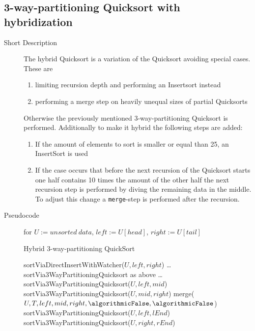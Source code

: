 \documentclass[11pt]{amsart}
\begin{document}
\newpage
\subsection{3-way-partitioning Quicksort with hybridization}
\begin{description}
	\item[Short Description] The hybrid Quicksort is a variation of the Quicksort avoiding special cases. These are
	\begin{enumerate}
		\item limiting recursion depth and performing an Insertsort instead
		\item performing a merge step on heavily unequal sizes of partial Quicksorts
	\end{enumerate}
Otherwise the previously mentioned 3-way-partitioning Quicksort is performed. Additionally to make it hybrid the following steps are added:
		\begin{enumerate}
			\item If the amount of elements to sort is smaller or equal than 25, an InsertSort is used
			\item If the case occurs that before the next recursion of the Quicksort starts one half contains 10 times the amount of the other half the next recursion step is performed by diving the remaining data in the middle. To adjust this change a \texttt{merge}-step is performed after the recursion.
		\end{enumerate}
	\item[Pseudocode] for $U := unsorted~data$, $left := U[head]$, $right := U[tail]$
	\begin{algorithm}
	\caption{Hybrid 3-way-partitioning QuickSort}
		\begin{algorithmic}[1]
				\State sortViaDirectInsertWithWatcher($U,left,right$)
			\Else
				\State \ldots
				\State sortVia3WayPartitioningQuicksort as above
				\State \ldots
					\State sortVia3WayPartitioningQuicksort($U, left, mid$)
					\State sortVia3WayPartitioningQuicksort($U, mid, right$)
					\State merge($U, T, left, mid, right, \algorithmicFalse, \algorithmicFalse$)
				\Else
					\State sortVia3WayPartitioningQuicksort($U, left, lEnd$)
					\State sortVia3WayPartitioningQuicksort($U, right, rEnd$)			
				\EndIf
			\EndIf
		\EndProcedure
		\end{algorithmic}
	\end{algorithm}	

\end{description}
\end{document}
